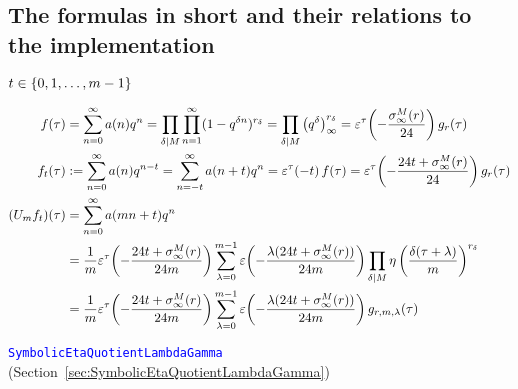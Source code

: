 \documentclass{article}
\begin{document}
\begin{Hemmecke}








\subsection{The formulas in short and their relations to the
  implementation}
\label{sec:formulas-in-short}
$t \in \Set{0,1,\ldots,m-1}$

\begin{align*}
  f(\tau)
  &=
  \sum_{n=0}^\infty a(n) q^n
  =
  \divisorprod{M}\prod_{n=1}^\infty(1-q^{\delta n})^{r_\delta}
  =
  \divisorprod{M}\eulerFunction{\delta}^{r_\delta}
  =
  \unityPowerTau{-\frac{\sigmainfty[M]{r}}{24}} g_r(\tau)
  \\
  f_t(\tau)
  &:=
  \sum_{n=0}^\infty a(n) q^{n-t}
  =
  \sum_{n=-t}^\infty a(n+t) q^{n}
  =
  \unityPowerTau{-t}f(\tau)
  =
  \unityPowerTau{-\frac{24t+\sigmainfty[M]{r}}{24}} g_r(\tau)
  \\
  (U_mf_t)(\tau)
  &=
    \sum_{n=0}^\infty a(mn+t) q^n
  \\
  &=
  \frac{1}{m}
  \unityPowerTau{-\frac{24t+\sigmainfty[M]{r}}{24m}}
  \sum_{\lambda=0}^{m-1}
  \unityPower{-\frac{\lambda (24t+\sigmainfty[M]{r})}{24m}}
  \divisorprod{M}
    \eta\left(\frac{\delta(\tau+\lambda)}{m}\right)^{r_\delta}
  \\
  &=
    \frac{1}{m}
    \unityPowerTau{-\frac{24t+\sigmainfty[M]{r}}{24m}}
    \sum_{\lambda=0}^{m-1}
    \unityPower{-\frac{\lambda (24t+\sigmainfty[M]{r})}{24m}}
    g_{r,m,\lambda}(\tau)
\end{align*}

\textcolor{blue}{\texttt{SymbolicEtaQuotientLambdaGamma}}
(Section~\ref{sec:SymbolicEtaQuotientLambdaGamma})


\end{Hemmecke}
\end{document}
